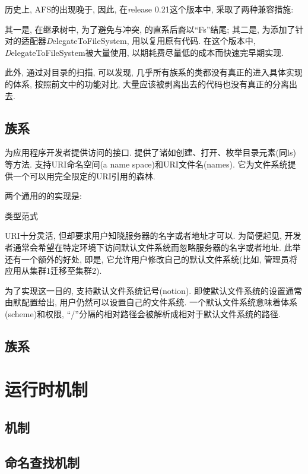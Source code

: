 历史上, AFS的出现晚于{\FiS}, 因此, 在{\emph release 0.21}这个版本中,
采取了两种兼容措施:

其一是, 在继承树中, 为了避免与{\FiS}冲突, {\AbsFS}的直系后裔以``Fs''结尾;
其二是, 为{\AbsFS}添加了针对{\FiS}的适配器{\emph DelegateToFileSystem},
用以复用原有代码. 在这个版本中, {\emph DelegateToFileSystem}被大量使用,
以期耗费尽量低的成本而快速完早期实现.

此外, 通过对目录的扫描, 可以发现, 几乎所有{\AbsFS}族系的类都没有真正的进入具体实现的体系,
按照前文中的功能对比, 大量应该被剥离出去的代码也没有真正的分离出去.

\subsection{{\FiC}族系}
\label{ssec:hfs:fc}

{\FiC}为应用程序开发者提供访问{\HadoopFS}的接口.
{\FiC}提供了诸如创建、打开、枚举目录元素(同ls)等方法.
{\HadoopFS}支持URI命名空间(a name space)和URI文件名(names).
它为文件系统提供一个可以用完全限定的URI引用的森林.

两个通用的{\HadoopFS}的实现是:
\begin{XeDuoLineTabular}{类型}{范式}
\end{XeDuoLineTabular}

URI十分灵活, 但却要求用户知晓服务器的名字或者地址才可以.
为简便起见, 开发者通常会希望在特定环境下访问默认文件系统而忽略服务器的名字或者地址.
此举还有一个额外的好处, 即是, 它允许用户修改自己的默认文件系统(比如, 管理员将应用从集群1迁移至集群2).

为了实现这一目的, {\Hadoop}支持默认文件系统记号(notion).
即使默认文件系统的设置通常由默配置给出, 用户仍然可以设置自己的文件系统.
一个默认文件系统意味着体系(scheme)和权限, ``/''分隔的相对路径会被解析成相对于默认文件系统的路径.

\subsection{{\Shell}族系}

\section{运行时机制}
\label{sec:hfs:rtm}

\subsection{{\Trash}机制}

\subsection{命名查找机制}
